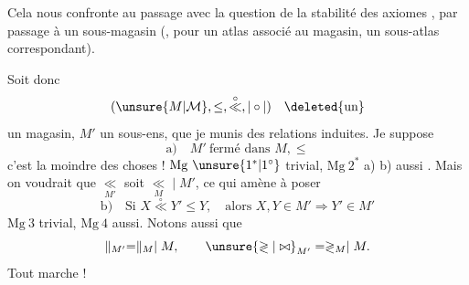 Cela nous confronte au passage avec la question de la stabilité des axiomes , par passage à un sous-magasin (, pour un atlas associé au magasin, un sous-atlas correspondant).

Soit donc
\[
(\unsure{M|\mathcal{M}},\leq,\overset{\circ}{\ll},\mathrel{|\circ|})\quad\deleted{\text{un}}
\]
un magasin, $M'$ un sous-ens, que je munis des relations induites.
Je suppose
\[
\text{a)}\quad M'\ \text{fermé dans }M,\leq
\]
c'est la moindre des choses ! $\mathrm{Mg}\ \unsure{1^*|1^\circ}$  trivial, $\mathrm{Mg}\ 2^*$ a) b) aussi . Mais on voudrait que $\underset{M'}{\ll}$  soit $\underset{M}{\ll}\mathrel{|}M'$, ce qui amène à poser
\[
\text{b)}\quad\text{Si }X\overset{\circ}{\ll}Y'\leq Y,\quad\text{alors }X,Y\in M'\Rightarrow Y'\in M'
\]
$\mathrm{Mg}\ 3$ trivial, $\mathrm{Mg}\ 4$ aussi. Notons aussi que
\[
\parallel_{M'}=\parallel_M\mathrel{|}M,\qquad\unsure{\gtrless|\bowtie}_{M'}=\gtrless_M\mathrel{|}M.
\]
Tout marche !
